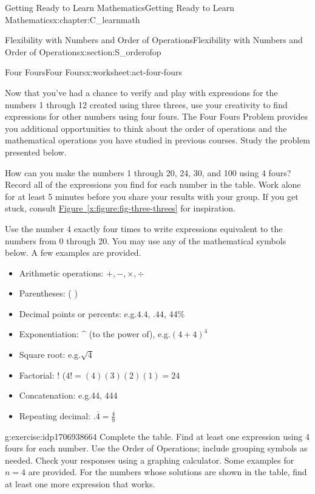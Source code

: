 \documentclass[oneside,10pt,]{book}
\newcommand{\xreffont}{\relax}
\numberwithin{equation}{chapter}
\begin{document}
\begin{chapterptx}{Getting Ready to Learn Mathematics}{}{Getting Ready to Learn Mathematics}{}{}{x:chapter:C_learnmath}
\begin{sectionptx}{Flexibility with Numbers and Order of Operations}{}{Flexibility with Numbers and Order of Operations}{}{}{x:section:S_orderofop}
\begin{worksheet-subsection}{Four Fours}{}{Four Fours}{}{}{x:worksheet:act-four-fours}
\begin{introduction}{}%
Now that you've had a chance to verify and play with expressions for the numbers 1 through 12 created using three threes, use your creativity to find expressions for other numbers using four fours. The Four Fours Problem provides you additional opportunities to think about the order of operations and the mathematical operations you have studied in previous courses. Study the problem presented below.%
\par
How can you make the numbers 1 through 20, 24, 30, and 100 using 4 fours? Record all of the expressions you find for each number in the table. Work alone for at least 5 minutes before you share your results with your group. If you get stuck, consult \hyperref[x:figure:fig-three-threes]{Figure~{\xreffont\ref{x:figure:fig-three-threes}}} for inspiration.%
\par
Use the number 4 exactly four times to write expressions equivalent to the numbers from 0 through 20. You may use any of the mathematical symbols below. A few examples are provided.%
\begin{itemize}[label=\textbullet]
\item{}Arithmetic operations: \(+, -, \times, \div\)%
\item{}Parentheses: ( )%
\item{}Decimal points or percents: e.g.\@ \(4.4\), \(.44\), 44\%%
\item{}Exponentiation: \textasciicircum{} (to the power of), e.g.\@ \((4 + 4)^4\)%
\item{}Square root: e.g.\@ \(\sqrt{4}\)%
\item{}Factorial: ! (\(4! = (4)(3)(2)(1) = 24\)%
\item{}Concatenation: e.g.\@ 44, 444%
\item{}Repeating decimal: \(. \overline{4} = \frac{4}{9}\)%
\end{itemize}
%
\end{introduction}%
\begin{divisionexercise}{1}{}{}{g:exercise:idp1706938664}%
Complete the table. Find at least one expression using 4 fours for each number. Use the Order of Operations; include grouping symbols as needed. Check your responses using a graphing calculator. Some examples for \(n = 4\) are provided. For the numbers whose solutions are shown in the table, find at least one more expression that works.%
\begin{center}%

\end{center}
\end{divisionexercise}
\end{worksheet-subsection}
\end{sectionptx}
\end{chapterptx}
\end{document}
